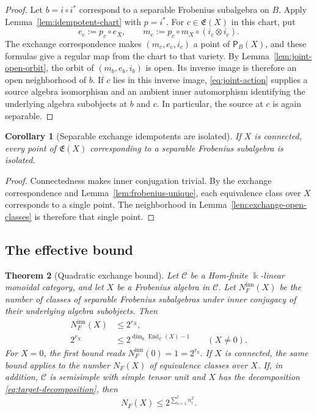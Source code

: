 \documentclass[11pt]{amsart}
\newtheorem{theorem}{Theorem}[section]
\newtheorem{corollary}[theorem]{Corollary}
\theoremstyle{definition}
\theoremstyle{remark}
\newcommand{\C}{\mathcal C}
\newcommand{\kk}{\Bbbk}
\newcommand{\Exch}{\mathfrak E}
\DeclareMathOperator{\End}{End}
\begin{document}
\begin{proof}
Let $b=i\circ i^*$ correspond to a separable Frobenius subalgebra on
$B$.  Apply Lemma~\ref{lem:idempotent-chart} with $p=i^*$.
For $c\in\Exch(X)$ in this chart, put
\begin{equation}\label{eq:source-varying}
 e_c:=p_c\circ e_X,\qquad
 m_c:=p_c\circ m_X\circ(i_c\otimes i_c).
\end{equation}
The exchange correspondence makes $(m_c,e_c,i_c)$ a point of
$\mathsf P_B(X)$, and these formulas give a regular map from the chart
to that variety.  By Lemma~\ref{lem:joint-open-orbit}, the orbit of
$(m_b,e_b,i_b)$ is open.  Its inverse image is therefore an open
neighborhood of $b$.  If $c$ lies in this inverse image,
\eqref{eq:joint-action} supplies a source algebra isomorphism and an
ambient inner automorphism identifying the underlying algebra subobjects
at $b$ and $c$.  In particular, the source at $c$ is again separable.
\end{proof}


\begin{corollary}[Separable exchange idempotents are isolated]
\label{lem:exchange-isolated}
If $X$ is connected, every point of $\Exch(X)$ corresponding to a
separable Frobenius subalgebra is isolated.
\end{corollary}

\begin{proof}
Connectedness makes inner conjugation trivial.  By the exchange
correspondence and Lemma~\ref{lem:frobenius-unique}, each equivalence
class over $X$ corresponds to a single point.  The neighborhood in
Lemma~\ref{lem:exchange-open-classes} is therefore that single point.
\end{proof}

\subsection{The effective bound}

\begin{theorem}[Quadratic exchange bound]\label{thm:exchange-bound}
Let $\C$ be a Hom-finite $\kk$-linear monoidal category, and let $X$
be a Frobenius algebra in $\C$.
Let $N_F^{\mathrm{inn}}(X)$ be the number of classes of separable
Frobenius subalgebras under inner conjugacy of their underlying algebra
subobjects.  Then
\begin{align}
 N_F^{\mathrm{inn}}(X)&\leq2^{r_X},\label{eq:exchange-bound}\\
 2^{r_X}&\leq2^{\dim_{\kk}\End_{\C}(X)-1}\qquad(X\ne0).
 \label{eq:exchange-coarse}
\end{align}
For $X=0$, the first bound reads $N_F^{\mathrm{inn}}(0)=1=2^{r_0}$.
If $X$ is connected, the same bound applies to the number $N_F(X)$ of
equivalence classes over $X$.  If, in addition, $\C$ is semisimple with
simple tensor unit and $X$ has the decomposition
\eqref{eq:target-decomposition}, then
\begin{equation}\label{eq:exchange-multiplicity}
 N_F(X)\leq2^{\sum_{i=1}^t n_i^2}.
\end{equation}
\end{theorem}
\end{document}
